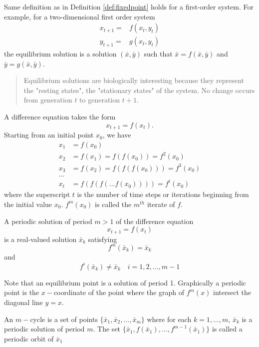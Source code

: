 Same definition as in Definition \ref{def:fixedpoint} holds for a first-order system. For example, for a two-dimensional first order system
$$
\begin{array}{cc}
x_{t+1}=&f(x_t,y_t)\\
y_{t+1}=&g(x_t,y_t)
\end{array}
$$
the equilibrium solution is a solution $(\bar x, \bar y)$ such that $\bar x= f(\bar x,\bar y)$ and $\bar y=g(\bar x,\bar y)$.

\begin{quote}
Equilibrium solutions are biologically interesting because they represent the "resting states", the "stationary states" of the system. No change occurs from generation $t$ to generation $t+1$. 
\end{quote}



A difference equation takes the form
\[
x_{t+1}=f(x_t).
\]
Starting from an initial point $x_0$, we have
\begin{align*}
x_1 &= f(x_0) \\
x_2 &= f(x_1)=f(f(x_0))=f^2(x_0) \\
x_3 &= f(x_2)=f(f(f(x_0)))=f^3(x_0) \\
\ldots &\\
x_t &= f(f(f(\dots f(x_0))))=f^t(x_0)
\end{align*}
where the superscript $t$ is the number of time steps or iterations beginning from the initial value $x_0$. $f^m(x_0)$ is called the $m^{th}$ iterate of $f$.




\begin{definition}
A periodic solution of period $m>1$ of the difference equation $$x_{t+1}=f(x_t)$$ is a real-valued solution $\bar x_k$ satisfying
$$f^m(\bar x_k)=\bar x_k$$ and $$f^i(\bar x_k)\not =\bar x_k \quad i=1,2,\dots, m-1$$
\end{definition}

Note that an equilibrium point is a solution of period 1.
Graphically a periodic point is the $x-$coordinate of the point where the graph of $f^m(x)$ intersect the diagonal line $y=x$.



\begin{definition}
An $m-$cycle is a set of points $\{\bar x _1, \bar x_2, \dots , \bar x_m\}$ where for each $k=1,\dots,m$, $\bar x_k$ is a periodic solution of period $m$. The set $\{\bar x_1, f(\bar x_1), \dots , f^{m-1}(\bar x_1) \}$ is called a periodic orbit of $\bar x_1$
\end{definition}



